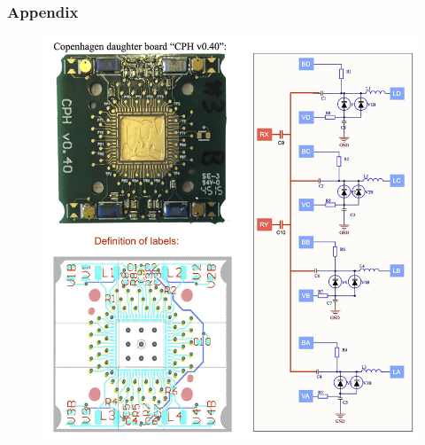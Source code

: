 \documentclass{beamer}
\begin{document}
\begin{frame}
    \frametitle{Appendix}

    \begin{figure}
        \centering
        \includegraphics[height=0.8\textheight]{cph_schematic.png}
    \end{figure}

\end{frame}
\end{document}
